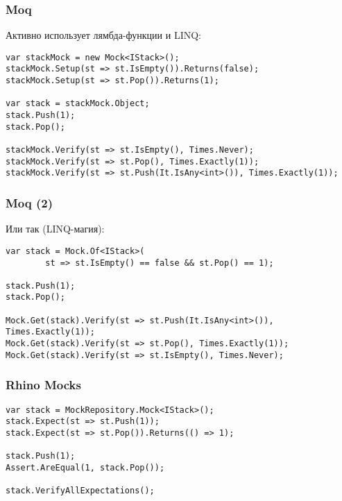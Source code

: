 \documentclass[xetex,mathserif,serif]{beamer}
\begin{document}
	\begin{frame}[fragile]
		\frametitle{Moq}
		Активно использует лямбда-функции и LINQ:
		\vspace{3mm}
		\begin{verbatim}
var stackMock = new Mock<IStack>();
stackMock.Setup(st => st.IsEmpty()).Returns(false);
stackMock.Setup(st => st.Pop()).Returns(1);

var stack = stackMock.Object;
stack.Push(1);
stack.Pop();

stackMock.Verify(st => st.IsEmpty(), Times.Never);
stackMock.Verify(st => st.Pop(), Times.Exactly(1));
stackMock.Verify(st => st.Push(It.IsAny<int>()), Times.Exactly(1));
		\end{verbatim}
	\end{frame}

	\begin{frame}[fragile]
		\frametitle{Moq (2)}
		Или так (LINQ-магия):
		\vspace{3mm}
		\begin{verbatim}
var stack = Mock.Of<IStack>(
        st => st.IsEmpty() == false && st.Pop() == 1);

stack.Push(1);
stack.Pop();

Mock.Get(stack).Verify(st => st.Push(It.IsAny<int>()), Times.Exactly(1));
Mock.Get(stack).Verify(st => st.Pop(), Times.Exactly(1));
Mock.Get(stack).Verify(st => st.IsEmpty(), Times.Never);
		\end{verbatim}
	\end{frame}

	\begin{frame}[fragile]
		\frametitle{Rhino Mocks}
		\begin{verbatim}
var stack = MockRepository.Mock<IStack>();
stack.Expect(st => st.Push(1));
stack.Expect(st => st.Pop()).Returns(() => 1);

stack.Push(1);
Assert.AreEqual(1, stack.Pop());

stack.VerifyAllExpectations();
		\end{verbatim}
	\end{frame}
\end{document}
